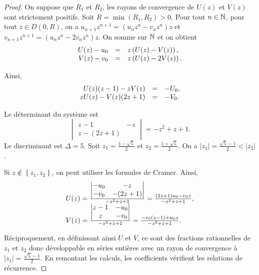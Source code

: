\documentclass[12pt]{article}
\begin{document}
\begin{proof}
    On suppose que $R_{1}$ et $R_{2}$, les rayons de convergence de $U(z)$ et $V(z)$ sont strictement positifs. Soit $R=\min(R_1,R_2)>0$. Pour tout $n\in\mathbb{N}$, pour tout $z\in D(0,R)$, on a $u_{n+1}z^{n+1}=\left(u_nz^{n}-v_nz^{n}\right)z$ et $v_{n+1}z^{n+1}=\left(u_nz^{n}-2v_nz^{n}\right)z$. On somme sur $\mathbb{N}$ et on obtient
    \begin{equation}
        \begin{array}[]{rcl}
            U(z)-u_0 &=& z\left(U(z)-V(z)\right),\\
            V(z)-v_0 &=& z\left(U(z)-2V(z)\right).
        \end{array}
    \end{equation}

    Ainsi,
    \begin{equation}
        \begin{array}[]{rcl}
            U(z)(z-1)-zV(z) &=& -U_0,\\
            zU(z)-V(z)(2z+1) &=& -V_0.
        \end{array}
    \end{equation}

    Le déterminant du système est 
    \begin{equation}
        \begin{vmatrix}
            z-1 & -z\\
            z -(2z+1)
        \end{vmatrix}=-z^{2}+z+1.
    \end{equation}
    Le discriminant est $\Delta=5$. Soit $z_{1}=\frac{1-\sqrt{5}}{2}$ et $z_2=\frac{1+\sqrt{5}}{2}$. On a $\left\lvert z_1\right\rvert=\frac{\sqrt{5}-1}{2}<\left\lvert z_2\right\rvert$.

    Si $z\not\in\left\lbrace z_1,z_2\right\rbrace$, on peut utiliser les formules de Cramer. Ainsi,
    \begin{equation}
        \begin{array}[]{l}
            U(z) = \frac{
                \begin{vmatrix}
                    -u_0 & -z\\
                    -v_0 & -(2z+1)
                \end{vmatrix}
            }{-z^{2}+z+1}=\frac{(2z+1)u_0-v_0z}{-z^{2}+z+1},\\
            V(z)= \frac{
                \begin{vmatrix}
                    z-1 & -u_0\\
                    z & -v_0
                \end{vmatrix}
            }{-z^{2}+z+1}=\frac{-v_0(z-1)+u_0z}{-z^{2}+z+1}.
        \end{array}
    \end{equation}

    Réciproquement, en définissant ainsi $U$ et $V$, ce sont des fractions rationnelles de $z_1$ et $z_2$ donc développable en séries entières avec un rayon de convergence à $\left\lvert z_1\right\rvert=\frac{\sqrt{5}-1}{2}$. En remontant les calculs, les coefficients vérifient les relations de récurrence.
\end{proof}
\end{document}
